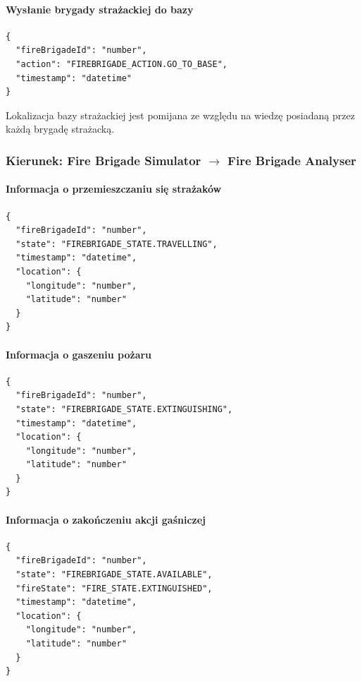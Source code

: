 \paragraph{Wysłanie brygady strażackiej do bazy}

\begin{verbatim}
{
  "fireBrigadeId": "number",
  "action": "FIREBRIGADE_ACTION.GO_TO_BASE",
  "timestamp": "datetime"
}
\end{verbatim}

Lokalizacja bazy strażackiej jest pomijana ze względu na wiedzę posiadaną przez każdą brygadę strażacką.

\subsubsection*{Kierunek: Fire Brigade Simulator $\rightarrow$ Fire Brigade Analyser}

\paragraph{Informacja o przemieszczaniu się strażaków}

\begin{verbatim}
{
  "fireBrigadeId": "number",
  "state": "FIREBRIGADE_STATE.TRAVELLING",
  "timestamp": "datetime",
  "location": {
    "longitude": "number",
    "latitude": "number"
  }
}
\end{verbatim}

\paragraph{Informacja o gaszeniu pożaru}

\begin{verbatim}
{
  "fireBrigadeId": "number",
  "state": "FIREBRIGADE_STATE.EXTINGUISHING",
  "timestamp": "datetime",
  "location": {
    "longitude": "number",
    "latitude": "number"
  }
}
\end{verbatim}

\paragraph{Informacja o zakończeniu akcji gaśniczej}

\begin{verbatim}
{
  "fireBrigadeId": "number",
  "state": "FIREBRIGADE_STATE.AVAILABLE",
  "fireState": "FIRE_STATE.EXTINGUISHED",
  "timestamp": "datetime",
  "location": {
    "longitude": "number",
    "latitude": "number"
  }
}
\end{verbatim}

